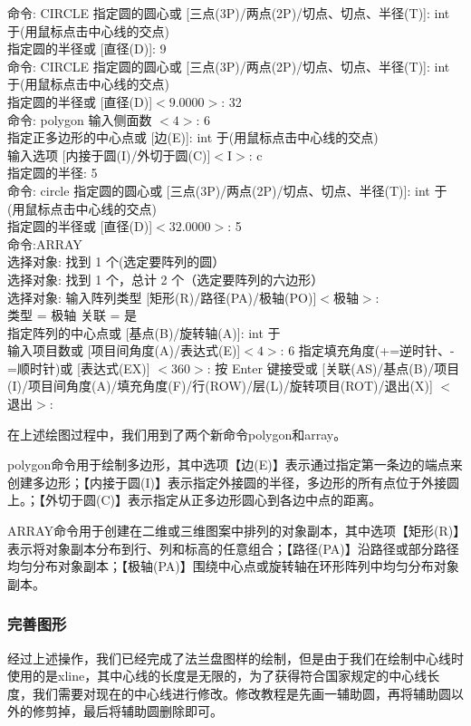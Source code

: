 \noindent
命令: CIRCLE 指定圆的圆心或 [三点(3P)/两点(2P)/切点、切点、半径(T)]: int 于(用鼠标点击中心线的交点)\\
指定圆的半径或 [直径(D)]: 9\\
命令:  CIRCLE 指定圆的圆心或 [三点(3P)/两点(2P)/切点、切点、半径(T)]: int 于(用鼠标点击中心线的交点)\\
指定圆的半径或 [直径(D)]$ <9.0000>$: 32\\
命令: polygon 输入侧面数 $<4>$: 6\\
指定正多边形的中心点或 [边(E)]: int 于(用鼠标点击中心线的交点)\\
输入选项 [内接于圆(I)/外切于圆(C)]$ <$I$>$: c\\
指定圆的半径: 5\\
命令: circle 指定圆的圆心或 [三点(3P)/两点(2P)/切点、切点、半径(T)]: int 于(用鼠标点击中心线的交点)\\
指定圆的半径或 [直径(D)]$ <32.0000>$: 5\\
命令:ARRAY\\
选择对象: 找到 1 个(选定要阵列的圆）\\
选择对象: 找到 1 个，总计 2 个（选定要阵列的六边形）\\
选择对象:  输入阵列类型 [矩形(R)/路径(PA)/极轴(PO)]$ <$极轴$>$:\\
类型 = 极轴  关联 = 是\\
指定阵列的中心点或 [基点(B)/旋转轴(A)]: int 于\\
输入项目数或 [项目间角度(A)/表达式(E)]$ <4>$: 6
指定填充角度(+=逆时针、-=顺时针)或 [表达式(EX)] $<360>$:
按 Enter 键接受或 [关联(AS)/基点(B)/项目(I)/项目间角度(A)/填充角度(F)/行(ROW)/层(L)/旋转项目(ROT)/退出(X)] 
$<$退出$>$:

在上述绘图过程中，我们用到了两个新命令polygon和array。

polygon命令用于绘制多边形，其中选项【边(E)】表示通过指定第一条边的端点来创建多边形；【内接于圆(I)】表示指定外接圆的半径，多边形的所有点位于外接圆上。；【外切于圆(C)】表示指定从正多边形圆心到各边中点的距离。

ARRAY命令用于创建在二维或三维图案中排列的对象副本，其中选项【矩形(R)】表示将对象副本分布到行、列和标高的任意组合；【路径(PA)】沿路径或部分路径均匀分布对象副本；【极轴(PA)】围绕中心点或旋转轴在环形阵列中均匀分布对象副本。

\subsubsection{完善图形}
经过上述操作，我们已经完成了法兰盘图样的绘制，但是由于我们在绘制中心线时使用的是xline，其中心线的长度是无限的，为了获得符合国家规定的中心线长度，我们需要对现在的中心线进行修改。修改教程是先画一辅助圆，再将辅助圆以外的修剪掉，最后将辅助圆删除即可。

